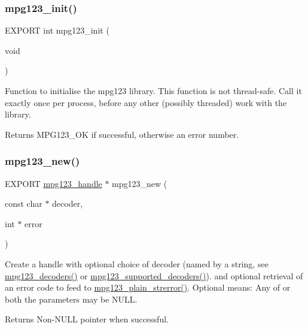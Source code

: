 \subsubsection{\texorpdfstring{mpg123\+\_\+init()}{mpg123\_init()}}
{\footnotesize\ttfamily E\+X\+P\+O\+RT int mpg123\+\_\+init (\begin{DoxyParamCaption}\item[{void}]{ }\end{DoxyParamCaption})}

Function to initialise the mpg123 library. This function is not thread-\/safe. Call it exactly once per process, before any other (possibly threaded) work with the library.

\begin{DoxyReturn}{Returns}
M\+P\+G123\+\_\+\+OK if successful, otherwise an error number. 
\end{DoxyReturn}
\mbox{\label{group__mpg123__init_gabe8db4b9a52616d1da89c17a85b99afe}} 
\subsubsection{\texorpdfstring{mpg123\+\_\+new()}{mpg123\_new()}}
{\footnotesize\ttfamily E\+X\+P\+O\+RT \hyperlink{group__mpg123__init_ga6728e2839a395f3a07d4514da659faca}{mpg123\+\_\+handle} $\ast$ mpg123\+\_\+new (\begin{DoxyParamCaption}\item[{const char $\ast$}]{decoder,  }\item[{int $\ast$}]{error }\end{DoxyParamCaption})}

Create a handle with optional choice of decoder (named by a string, see \hyperlink{group__mpg123__decoder_ga3e8b169646870ff0848840c6f555ce6f}{mpg123\+\_\+decoders()} or \hyperlink{group__mpg123__decoder_ga73a5e970f8ab6b12778e5959373721d8}{mpg123\+\_\+supported\+\_\+decoders()}). and optional retrieval of an error code to feed to \hyperlink{group__mpg123__error_ga0254f1c6f70074fa404e85735735ca0c}{mpg123\+\_\+plain\+\_\+strerror()}. Optional means\+: Any of or both the parameters may be N\+U\+LL.

\begin{DoxyReturn}{Returns}
Non-\/\+N\+U\+LL pointer when successful. 
\end{DoxyReturn}
\mbox{\label{group__mpg123__init_ga4496c0fc5c1f9dc141a0090a640e5857}} 
